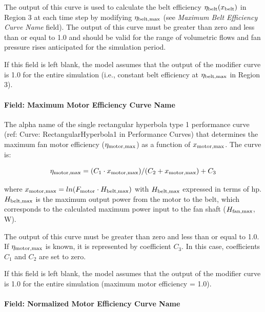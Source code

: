 The output of this curve is used to calculate the belt efficiency \(\eta_{\rm{belt}} (x_{\rm{belt}})\) in Region 3 at each time step by modifying \(\eta_{\rm{belt, max}}\) (see \emph{Maximum Belt Efficiency Curve Name} field). The output of this curve must be greater than zero and less than or equal to 1.0 and should be valid for the range of volumetric flows and fan pressure rises anticipated for the simulation period.

If this field is left blank, the model assumes that the output of the modifier curve is 1.0 for the entire simulation (i.e., constant belt efficiency at \(\eta_{\rm{belt, max}}\) in Region 3).

\paragraph{Field: Maximum Motor Efficiency Curve Name}\label{field-maximum-motor-efficiency-curve-name}

The alpha name of the single rectangular hyperbola type 1 performance curve (ref: Curve: RectangularHyperbola1 in Performance Curves) that determines the maximum fan motor efficiency (\(\eta_{\rm{motor, max}}\)) as a function of \(x_{\rm{motor, max}}\). The curve is:

\begin{equation}
  \eta_{\rm{motor, max}} = (C_1 \cdot x_{\rm{motor, max}}) / (C_2 + x_{\rm{motor, max}}) + C_3
\end{equation}

where \(x_{\rm{motor, max}} = ln(F_{\rm{motor}} \cdot H_{\rm{belt, max}})\) with \(H_{\rm{belt, max}}\) expressed in terms of hp. \(H_{\rm{belt, max}}\) is the maximum output power from the motor to the belt, which corresponds to the calculated maximum power input to the fan shaft (\(H_{\rm{fan, max}}\), W).

The output of this curve must be greater than zero and less than or equal to 1.0. If \(\eta_{\rm{motor, max}}\) is known, it is represented by coefficient \(C_3\). In this case, coefficients \(C_1\) and \(C_2\) are set to zero.

If this field is left blank, the model assumes that the output of the modifier curve is 1.0 for the entire simulation (maximum motor efficiency = 1.0).

\paragraph{Field: Normalized Motor Efficiency Curve Name}\label{field-normalized-motor-efficiency-curve-name}

